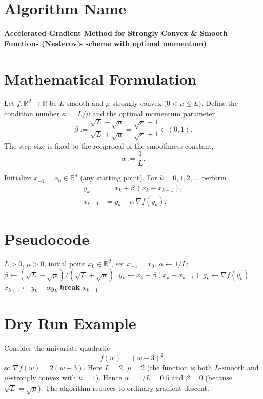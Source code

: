 \documentclass[11pt]{article}
\newcommand{\grad}{\nabla}
\begin{document}
\section*{Algorithm Name}
\textbf{Accelerated Gradient Method for Strongly Convex \& Smooth Functions (Nesterov’s scheme with optimal momentum)}  

\section*{Mathematical Formulation}
Let $f:\mathbb{R}^d\rightarrow\mathbb{R}$ be $L$‑smooth and $\mu$‑strongly convex ($0<\mu\le L$).  
Define the condition number $\kappa:=L/\mu$ and the optimal momentum parameter
\[
\beta:=\frac{\sqrt{L}-\sqrt{\mu}}{\sqrt{L}+\sqrt{\mu}}
      =\frac{\sqrt{\kappa}-1}{\sqrt{\kappa}+1}\in(0,1).
\]
The step size is fixed to the reciprocal of the smoothness constant,
\[
\alpha:=\frac{1}{L}.
\]

Initialize $x_{-1}=x_0\in\mathbb{R}^d$ (any starting point).  
For $k=0,1,2,\dots$ perform
\[
\boxed{
\begin{aligned}
y_k &= x_k + \beta\,(x_k-x_{k-1}),\\[4pt]
x_{k+1} &= y_k - \alpha\,\grad f(y_k).
\end{aligned}}
\tag{1}
\]

\section*{Pseudocode}
\begin{algorithm}[H]
\caption{Accelerated Gradient for Strongly Convex \& Smooth $f$}
\begin{algorithmic}[1]
\Require $L>0$, $\mu>0$, initial point $x_0\in\mathbb{R}^d$, set $x_{-1}=x_0$.
\State $\alpha \gets 1/L$; \quad $\beta \gets (\sqrt{L}-\sqrt{\mu})/(\sqrt{L}+\sqrt{\mu})$.
    \State $y_k \gets x_k + \beta (x_k-x_{k-1})$ 
    \State $g_k \gets \grad f(y_k)$
    \State $x_{k+1} \gets y_k - \alpha g_k$ 
        \State \textbf{break}
    \EndIf
\EndFor
\State \Return $x_{k+1}$
\end{algorithmic}
\end{algorithm}

\section*{Dry Run Example}
Consider the univariate quadratic
\[
f(w)=(w-3)^2,
\]
so $\grad f(w)=2(w-3)$.  
Here $L=2$, $\mu=2$ (the function is both $L$‑smooth and $\mu$‑strongly convex with $\kappa=1$).  
Hence $\alpha=1/L=0.5$ and $\beta=0$ (because $\sqrt{L}=\sqrt{\mu}$).  
The algorithm reduces to ordinary gradient descent.
\end{document}
